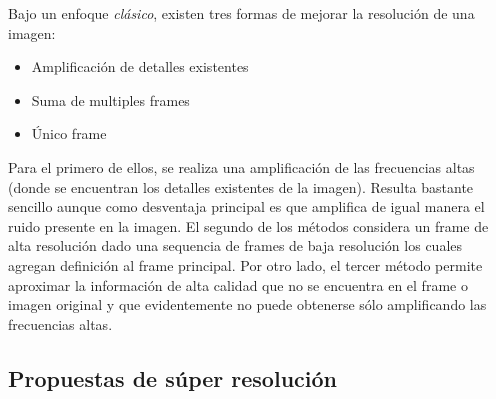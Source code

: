 \noindent
Bajo un enfoque \emph{clásico}, existen tres formas de mejorar la resolución 
de una imagen:

\begin{itemize}
    \item Amplificación de detalles existentes
    \item Suma de multiples frames
    \item Único frame
\end{itemize}

Para el primero de ellos, se realiza una amplificación de las frecuencias altas
(donde se encuentran los detalles existentes de la imagen). Resulta bastante 
sencillo aunque como desventaja principal es que amplifica de igual manera el ruido
presente en la imagen. 
El segundo de los métodos considera un frame de alta resolución dado una sequencia
de frames de baja resolución los cuales agregan definición al frame principal. Por
otro lado, el tercer método permite aproximar la información de alta calidad que 
no se encuentra en el frame o imagen original y que evidentemente no puede obtenerse
sólo amplificando las frecuencias altas. 

\subsection{Propuestas de súper resolución}